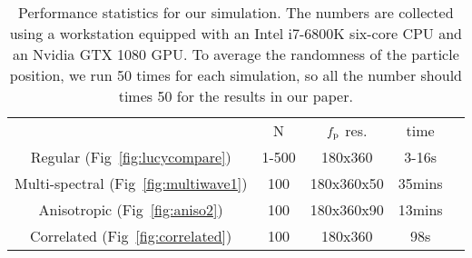 \begin{table}[t]
    \caption{\label{fig:time}
        Performance statistics for our simulation.
		The numbers are collected using a workstation equipped with an Intel i7-6800K six-core CPU and an Nvidia GTX 1080 GPU.
		To average the randomness of the particle position, we run 50 times for each simulation, so all the number should times 50 for the results in our paper.
    }
    \begin{tabular}{ccccc}
    \hline
                                                    & N     & $f_\mathrm{p}$ res.    & time   \\
    Regular (Fig~\ref{fig:lucycompare})             & 1-500 &  180x360         & 3-16s  \\
    Multi-spectral (Fig~\ref{fig:multiwave1})       & 100   &  180x360x50      & 35mins \\
    Anisotropic (Fig~\ref{fig:aniso2})              & 100   &  180x360x90      & 13mins \\
    Correlated (Fig~\ref{fig:correlated})           & 100   &  180x360         & 98s    \\
    \hline
    \end{tabular}
\end{table}

